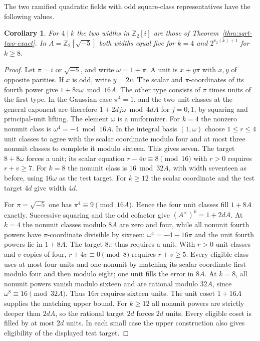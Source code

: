 \documentclass[11pt,letterpaper]{article}
\newtheorem{corollary}[corollary]{Corollary}
\theoremstyle{definition}
\numberwithin{equation}{section}
\begin{document}
The two ramified quadratic fields with odd square-class representatives
have the following values.
\begin{corollary}\label{cor:odd-radicand-widths}
For $4\mid k$ the two widths in $\mathbb Z_2[i]$ are those of
Theorem~\ref{thm:sqrt-two-exact}. In $A=\mathbb Z_2[\sqrt{-5}]$
both widths equal five for $k=4$ and $2^{v_2(k)+1}$ for $k\ge8$.
\end{corollary}
\begin{proof}
Let $\pi=i$ or $\sqrt{-5}$, and write $\omega=1+\pi$.
A unit is $x+y\pi$ with $x,y$ of opposite parities. If $x$ is odd,
write $y=2v$. The scalar and $\pi$-coordinates of its fourth power
give $1+8v\omega\bmod16A$. The other type consists of $\pi$ times
units of the first type. In the Gaussian case $\pi^4=1$, and the
two unit classes at the general exponent are therefore
$1+2dj\omega\bmod4dA$ for $j=0,1$, by squaring and principal-unit
lifting. The element $\omega$ is a uniformizer. For $k=4$ the
nonzero nonunit class is $\omega^4=-4\bmod16A$. In the integral
basis $(1,\omega)$ choose $1\le r\le4$ unit classes to agree
with the scalar coordinate modulo four and at most three nonunit
classes to complete it modulo sixteen. This gives seven. The
target $8+8\omega$ forces a unit; its scalar equation
$r-4v\equiv8\pmod{16}$ with $r>0$ requires $r+v\ge7$.
For $k=8$ the nonunit class is $16\bmod32A$, with width seventeen
as before, using $16\omega$ as the test target.
For $k\ge12$ the scalar coordinate and the test target $4d$
give width $4d$.

For $\pi=\sqrt{-5}$ one has $\pi^4\equiv9\pmod{16A}$.
Hence the four unit classes fill $1+8A$ exactly. Successive squaring
and the odd cofactor give $(A^\times)^k=1+2dA$. At $k=4$ the
nonunit classes modulo $8A$ are zero and four, while all nonunit
fourth powers have $\pi$-coordinate divisible by sixteen:
$\omega^4=-4-16\pi$ and the unit fourth powers lie in $1+8A$.
The target $8\pi$ thus requires a unit. With $r>0$ unit classes
and $v$ copies of four, $r+4v\equiv0\pmod8$ requires $r+v\ge5$.
Every eligible class uses at most four units and one nonunit
by matching its scalar coordinate first modulo four and then
modulo eight; one unit fills the error in $8A$.
At $k=8$, all nonunit powers vanish modulo sixteen and are rational
modulo $32A$, since $\omega^8\equiv16\pmod{32A}$. Thus $16\pi$
requires sixteen units. The unit coset $1+16A$ supplies the
matching upper bound. For $k\ge12$ all nonunit powers are
strictly deeper than $2dA$, so the rational target $2d$ forces
$2d$ units. Every eligible coset is filled by at most $2d$ units.
In each small case the upper construction also gives eligibility
of the displayed test target.
\end{proof}
\end{document}

